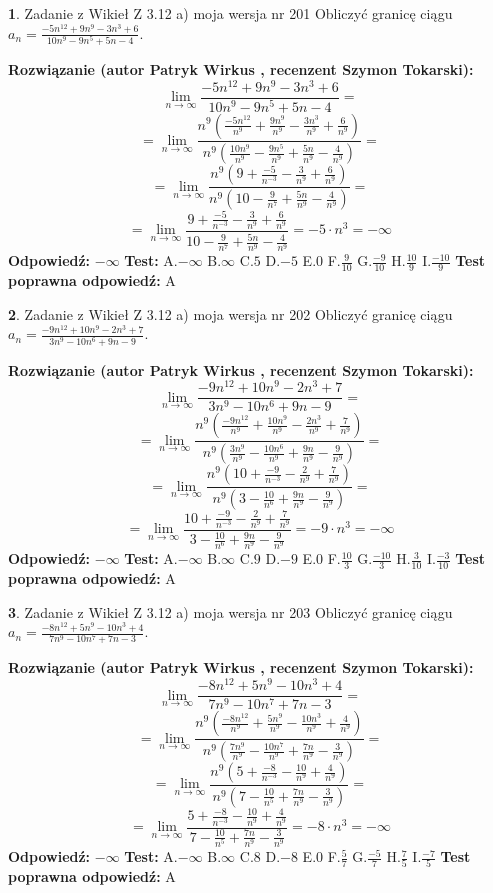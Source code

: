 \documentclass[12pt, a4paper]{article}
\theoremstyle{definition} %
\newtheorem{zad}{}
\newcommand{\zadStart}[1]{\begin{zad}#1\newline}
\newcommand{\zadStop}{\end{zad}}
\newcommand{\rozwStart}[2]{\noindent \textbf{Rozwiązanie (autor #1 , recenzent #2): }\newline}
\newcommand{\rozwStop}{\newline}
\newcommand{\odpStart}{\noindent \textbf{Odpowiedź:}\newline}
\newcommand{\odpStop}{\newline}
\newcommand{\testStart}{\noindent \textbf{Test:}\newline}
\newcommand{\testStop}{\newline}
\newcommand{\kluczStart}{\noindent \textbf{Test poprawna odpowiedź:}\newline}
\newcommand{\kluczStop}{\newline}
\begin{document}
\zadStart{Zadanie z Wikieł Z 3.12 a) moja wersja nr 201}
Obliczyć granicę ciągu $a_{n}=\frac{-5n^{12}+9n^{9}-3n^{3}+6}{10n^{9}-9n^{5}+5n-4}$.
\zadStop
\rozwStart{Patryk Wirkus}{Szymon Tokarski}
$$\lim\limits_{n\to\infty}\frac{-5n^{12}+9n^{9}-3n^{3}+6}{10n^{9}-9n^{5}+5n-4}=$$
$$=\lim\limits_{n\to\infty}\frac{n^{9}\left(\frac{-5n^{12}}{n^{9}}+\frac{9n^{9}}{n^{9}}-\frac{3n^{3}}{n^{9}}+\frac{6}{n^{9}}\right)}{n^{9}\left(\frac{10n^{9}}{n^{9}}-\frac{9n^{5}}{n^{9}}+\frac{5n}{n^{9}}-\frac{4}{n^{9}}\right)}=$$
$$=\lim\limits_{n\to\infty}\frac{n^{9}\left(9+\frac{-5}{n^{-3}}-\frac{3}{n^{9}}+\frac{6}{n^{9}}\right)}
{n^{9}\left(10-\frac{9}{n^{7}}+\frac{5n}{n^{9}}-\frac{4}{n^{9}}\right)}=$$
$$=\lim\limits_{n\to\infty}\frac{9+\frac{-5}{n^{-3}}-\frac{3}{n^{9}}+\frac{6}{n^{9}}}{10-\frac{9}{n^{7}}+\frac{5n}{n^{9}}-\frac{4}{n^{9}}}=-5\cdot n^{3} = -\infty$$
\rozwStop
\odpStart
$-\infty$
\odpStop
\testStart
A.$-\infty$
B.$\infty$
C.$5$
D.$-5$
E.$0$
F.$\frac{9}{10}$
G.$\frac{-9}{10}$
H.$\frac{10}{9}$
I.$\frac{-10}{9}$
\testStop
\kluczStart
A
\kluczStop



\zadStart{Zadanie z Wikieł Z 3.12 a) moja wersja nr 202}
Obliczyć granicę ciągu $a_{n}=\frac{-9n^{12}+10n^{9}-2n^{3}+7}{3n^{9}-10n^{6}+9n-9}$.
\zadStop
\rozwStart{Patryk Wirkus}{Szymon Tokarski}
$$\lim\limits_{n\to\infty}\frac{-9n^{12}+10n^{9}-2n^{3}+7}{3n^{9}-10n^{6}+9n-9}=$$
$$=\lim\limits_{n\to\infty}\frac{n^{9}\left(\frac{-9n^{12}}{n^{9}}+\frac{10n^{9}}{n^{9}}-\frac{2n^{3}}{n^{9}}+\frac{7}{n^{9}}\right)}{n^{9}\left(\frac{3n^{9}}{n^{9}}-\frac{10n^{6}}{n^{9}}+\frac{9n}{n^{9}}-\frac{9}{n^{9}}\right)}=$$
$$=\lim\limits_{n\to\infty}\frac{n^{9}\left(10+\frac{-9}{n^{-3}}-\frac{2}{n^{9}}+\frac{7}{n^{9}}\right)}
{n^{9}\left(3-\frac{10}{n^{6}}+\frac{9n}{n^{9}}-\frac{9}{n^{9}}\right)}=$$
$$=\lim\limits_{n\to\infty}\frac{10+\frac{-9}{n^{-3}}-\frac{2}{n^{9}}+\frac{7}{n^{9}}}{3-\frac{10}{n^{6}}+\frac{9n}{n^{9}}-\frac{9}{n^{9}}}=-9\cdot n^{3} = -\infty$$
\rozwStop
\odpStart
$-\infty$
\odpStop
\testStart
A.$-\infty$
B.$\infty$
C.$9$
D.$-9$
E.$0$
F.$\frac{10}{3}$
G.$\frac{-10}{3}$
H.$\frac{3}{10}$
I.$\frac{-3}{10}$
\testStop
\kluczStart
A
\kluczStop



\zadStart{Zadanie z Wikieł Z 3.12 a) moja wersja nr 203}
Obliczyć granicę ciągu $a_{n}=\frac{-8n^{12}+5n^{9}-10n^{3}+4}{7n^{9}-10n^{7}+7n-3}$.
\zadStop
\rozwStart{Patryk Wirkus}{Szymon Tokarski}
$$\lim\limits_{n\to\infty}\frac{-8n^{12}+5n^{9}-10n^{3}+4}{7n^{9}-10n^{7}+7n-3}=$$
$$=\lim\limits_{n\to\infty}\frac{n^{9}\left(\frac{-8n^{12}}{n^{9}}+\frac{5n^{9}}{n^{9}}-\frac{10n^{3}}{n^{9}}+\frac{4}{n^{9}}\right)}{n^{9}\left(\frac{7n^{9}}{n^{9}}-\frac{10n^{7}}{n^{9}}+\frac{7n}{n^{9}}-\frac{3}{n^{9}}\right)}=$$
$$=\lim\limits_{n\to\infty}\frac{n^{9}\left(5+\frac{-8}{n^{-3}}-\frac{10}{n^{9}}+\frac{4}{n^{9}}\right)}
{n^{9}\left(7-\frac{10}{n^{5}}+\frac{7n}{n^{9}}-\frac{3}{n^{9}}\right)}=$$
$$=\lim\limits_{n\to\infty}\frac{5+\frac{-8}{n^{-3}}-\frac{10}{n^{9}}+\frac{4}{n^{9}}}{7-\frac{10}{n^{5}}+\frac{7n}{n^{9}}-\frac{3}{n^{9}}}=-8\cdot n^{3} = -\infty$$
\rozwStop
\odpStart
$-\infty$
\odpStop
\testStart
A.$-\infty$
B.$\infty$
C.$8$
D.$-8$
E.$0$
F.$\frac{5}{7}$
G.$\frac{-5}{7}$
H.$\frac{7}{5}$
I.$\frac{-7}{5}$
\testStop
\kluczStart
A
\kluczStop
\end{document}
